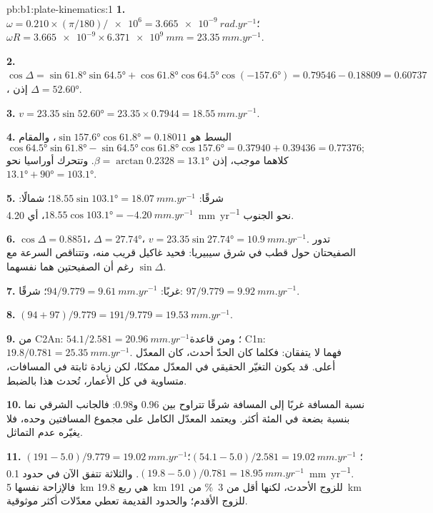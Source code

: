 \begin{solution}{pb:b1:plate-kinematics:1}
\textbf{1.} $\omega = 0.210\times(\pi/180)/\num{e6} = \qty{3.665e-9}{rad.yr^{-1}}$؛
$\omega R = \num{3.665e-9}\times\qty{6.371e9}{mm} = \qty{23.35}{mm.yr^{-1}}$.

\textbf{2.} $\cos\Delta = \sin\ang{61.8}\sin\ang{64.5} + \cos\ang{61.8}
\cos\ang{64.5}\cos(\ang{-157.6}) = 0.79546 - 0.18809 = 0.60737$، إذن
$\Delta = \ang{52.60}$.

\textbf{3.} $v = 23.35\sin\ang{52.60} = 23.35\times0.7944 =
\qty{18.55}{mm.yr^{-1}}$.

\textbf{4.} البسط هو $\sin\ang{157.6}\cos\ang{61.8} = 0.18011$، والمقام
\[
  \cos\ang{64.5}\sin\ang{61.8} - \sin\ang{64.5}\cos\ang{61.8}\cos\ang{157.6} =
  0.37940 + 0.39436 = 0.77376;
\]
كلاهما موجب، إذن $\beta = \arctan 0.2328 =
\ang{13.1}$. وتتحرك أوراسيا نحو $\ang{13.1} + \ang{90} = \ang{103.1}$.

\textbf{5.} شرقًا: $18.55\sin\ang{103.1} = \qty{18.07}{mm.yr^{-1}}$؛ شمالًا:
$18.55\cos\ang{103.1} = \qty{-4.20}{mm.yr^{-1}}$، أي \qty{4.20}{mm.yr^{-1}} نحو الجنوب.

\textbf{6.} $\cos\Delta = 0.8851$، $\Delta = \ang{27.74}$، $v = 23.35
\sin\ang{27.74} = \qty{10.9}{mm.yr^{-1}}$. تدور الصفيحتان حول قطب في شرق سيبيريا: فحيد غاكيل قريب منه، وتتناقص السرعة مع $\sin\Delta$ رغم أن الصفيحتين هما نفسهما.

\textbf{7.} غربًا: $94/9.779 = \qty{9.61}{mm.yr^{-1}}$؛ شرقًا: $97/9.779 =
\qty{9.92}{mm.yr^{-1}}$.

\textbf{8.} $(94 + 97)/9.779 = 191/9.779 = \qty{19.53}{mm.yr^{-1}}$.

\textbf{9.} من C2An: $54.1/2.581 = \qty{20.96}{mm.yr^{-1}}$؛ ومن قاعدة C1n: $19.8/0.781 = \qty{25.35}{mm.yr^{-1}}$. فهما لا يتفقان: فكلما كان الحدّ أحدث، كان المعدّل أعلى. قد يكون التغيّر الحقيقي في المعدّل ممكنًا، لكن زيادة ثابتة في المسافات، متساوية في كل الأعمار، تُحدث هذا بالضبط.

\textbf{10.} نسبة المسافة غربًا إلى المسافة شرقًا تتراوح بين 0.96 و0.98: فالجانب الشرقي نما بنسبة بضعة في المئة أكثر. ويعتمد المعدّل الكامل على مجموع المسافتين وحده، فلا يغيّره عدم التماثل.

\textbf{11.} $(191 - 5.0)/9.779 = \qty{19.02}{mm.yr^{-1}}$؛
$(54.1 - 5.0)/2.581 = \qty{19.02}{mm.yr^{-1}}$؛ $(19.8 - 5.0)/0.781 =
\qty{18.95}{mm.yr^{-1}}$. والثلاثة تتفق الآن في حدود \qty{0.1}{mm.yr^{-1}}. فالإزاحة نفسها \qty{5}{km} هي ربع \qty{19.8}{km} للزوج الأحدث، لكنها أقل من \qty{3}{\percent} من \qty{191}{km} للزوج الأقدم؛ والحدود القديمة تعطي معدّلات أكثر موثوقية.


\end{solution}
